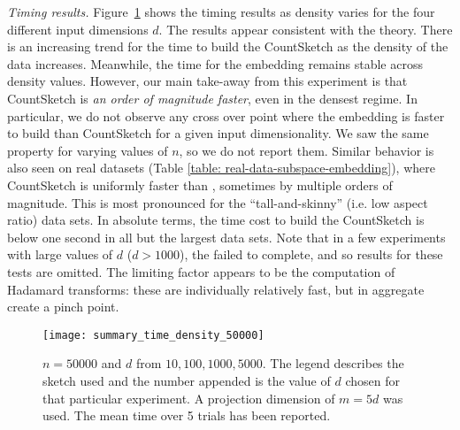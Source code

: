 \noindent
\textit{Timing results.}
Figure~\ref{fig: summary-time-50000} shows the timing results as
density varies for the four different input dimensions $d$.
The results appear consistent with the theory.
There is an increasing
trend for the time to build the CountSketch as the density of the data
increases.
Meanwhile, the time for the \SRHT embedding remains stable across
density values. 
%
However, our main take-away from this experiment is that CountSketch
is \textit{an order of magnitude faster}, even in the densest regime. 
In particular, we do not observe any cross over point where the \SRHT
embedding is faster to build than CountSketch for a given input
dimensionality. 
We saw the same property for varying values of $n$, so we do not
report them. 
Similar behavior is also seen on real datasets (Table
\ref{table: real-data-subspace-embedding}), where CountSketch is
uniformly faster than \SRHT, sometimes by multiple orders of
magnitude.
This is most pronounced for the ``tall-and-skinny'' (i.e. low aspect
ratio) data sets. 
In absolute terms, the time cost to build the CountSketch is below one
second in all but the largest data sets. 
Note that in a few experiments with large values of $d$ ($d>1000$),
the \SRHT failed to complete, and so results for these tests are
omitted. 
The limiting factor appears to be the computation of Hadamard
transforms: these are individually relatively fast, but in aggregate create a
pinch point. 


\begin{figure}
  \centering
\texttt{[image: summary\_time\_density\_50000]}
        \caption{$n=50000$ and $d$ from $10,100,1000,5000$.  The legend
        describes the sketch used and the number appended is the value of $d$
        chosen for that particular experiment.
        A projection dimension of $m=5d$ was used.
        The mean time over 5 trials has been reported.}
        \label{fig: summary-time-50000}
\end{figure}









